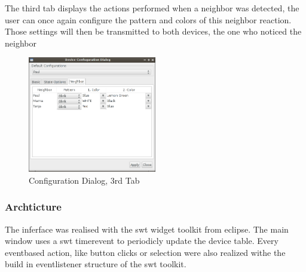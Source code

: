 The third tab displays the actions performed when a neighbor was detected, the user can once again configure the pattern and colors of this neighbor reaction. Those settings will then be transmitted to both devices, the one who noticed the neighbor

\begin{figure}[h!]
 \centering
 \includegraphics[width= 0.5\textwidth, clip=true  ,keepaspectratio=true]{./pic/java-server-config03.png}
 \caption{Configuration Dialog, 3rd Tab}
 \label{fig:java-server-config01}
\end{figure}

\subsubsection{Archticture}
The inferface was realised with the swt widget toolkit from eclipse. The main window uses a swt timerevent to periodicly update the device table. Every eventbased action, like button clicks or selection were also realized withe the build in eventlistener structure of the swt toolkit.



